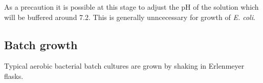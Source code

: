 \documentclass[a4paper]{article}
\newcommand{\ec}{\textit{E. coli}}
\begin{document}
\begin{multicols}{2}
As a precaution it is possible at this stage to adjust the pH of the solution
which will be buffered around 7.2. This is generally unncecessary for growth of
\ec.


\subsection{Batch growth}
Typical aerobic bacterial batch cultures are grown by shaking in Erlenmeyer flasks. 




\end{multicols} 
\end{document}
